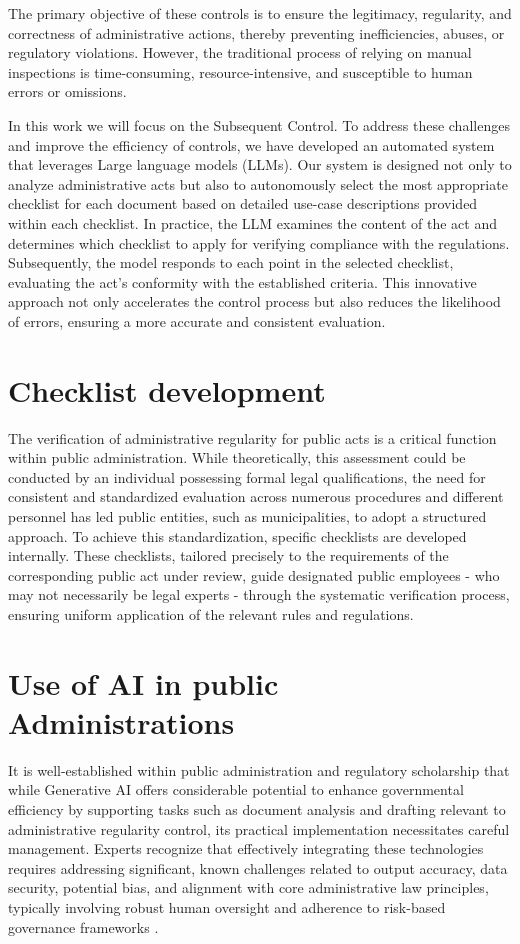 \documentclass[../main.tex]{subfiles}
\begin{document}
The primary objective of these controls is to ensure the legitimacy, regularity, and correctness of administrative actions, thereby preventing inefficiencies, abuses, or regulatory violations. However, the traditional process of relying on manual inspections is time-consuming, resource-intensive, and susceptible to human errors or omissions.

In this work we will focus  on the Subsequent Control. To address these challenges and improve the efficiency of controls, we have developed an automated system that leverages Large language models (LLMs). Our system is designed not only to analyze administrative acts but also to autonomously select the most appropriate checklist for each document based on detailed use-case descriptions provided within each checklist. In practice, the LLM examines the content of the act and determines which checklist to apply for verifying compliance with the regulations. Subsequently, the model responds to each point in the selected checklist, evaluating the act's conformity with the established criteria. This innovative approach not only accelerates the control process but also reduces the likelihood of errors, ensuring a more accurate and consistent evaluation.


\section{Checklist development}
The verification of administrative regularity for public acts is a critical function within public administration. While theoretically, this assessment could be conducted by an individual possessing formal legal qualifications, the need for consistent and standardized evaluation across numerous procedures and different personnel has led public entities, such as municipalities, to adopt a structured approach. To achieve this standardization, specific checklists are developed internally. These checklists, tailored precisely to the requirements of the corresponding public act under review, guide designated public employees - who may not necessarily be legal experts - through the systematic verification process, ensuring uniform application of the relevant rules and regulations.

\section{Use of AI in public Administrations}
It is well-established within public administration and regulatory scholarship that while Generative AI offers considerable potential to enhance governmental efficiency by supporting tasks such as document analysis and drafting relevant to administrative regularity control, its practical implementation necessitates careful management. Experts recognize that effectively integrating these technologies requires addressing significant, known challenges related to output accuracy, data security, potential bias, and alignment with core administrative law principles, typically involving robust human oversight and adherence to risk-based governance frameworks \cite{weertsGenerativeAIPublic2025}.




\ifSubfilesClassLoaded{
    
    
}{}
\end{document}
